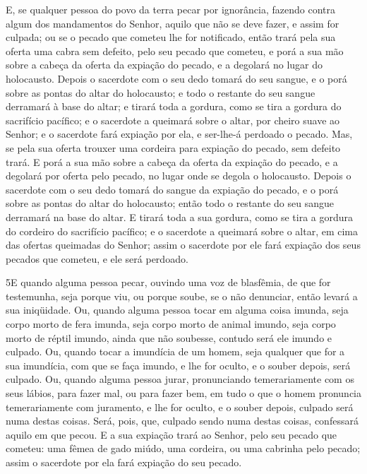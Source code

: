 E, se qualquer pessoa do povo da terra pecar por ignorância,
fazendo contra algum dos mandamentos do Senhor, aquilo que não se
deve fazer, e assim for culpada; ou se o pecado que cometeu
lhe for notificado, então trará pela sua oferta uma cabra sem
defeito, pelo seu pecado que cometeu, e porá a sua mão sobre
a cabeça da oferta da expiação do pecado, e a degolará no lugar do
holocausto. Depois o sacerdote com o seu dedo tomará do seu
sangue, e o porá sobre as pontas do altar do holocausto; e todo o
restante do seu sangue derramará à base do altar; e tirará
toda a gordura, como se tira a gordura do sacrifício pacífico; e o
sacerdote a queimará sobre o altar, por cheiro suave ao Senhor; e o
sacerdote fará expiação por ela, e ser-lhe-á perdoado o pecado.
Mas, se pela sua oferta trouxer uma cordeira para expiação do
pecado, sem defeito trará. E porá a sua mão sobre a cabeça da
oferta da expiação do pecado, e a degolará por oferta pelo pecado,
no lugar onde se degola o holocausto. Depois o sacerdote com
o seu dedo tomará do sangue da expiação do pecado, e o porá sobre as
pontas do altar do holocausto; então todo o restante do seu sangue
derramará na base do altar. E tirará toda a sua gordura, como
se tira a gordura do cordeiro do sacrifício pacífico; e o sacerdote
a queimará sobre o altar, em cima das ofertas queimadas do Senhor;
assim o sacerdote por ele fará expiação dos seus pecados que
cometeu, e ele será perdoado.

\medskip

\lettrine{5} E quando alguma pessoa pecar, ouvindo uma voz de
blasfêmia, de que for testemunha, seja porque viu, ou porque soube,
se o não denunciar, então levará a sua iniqüidade. Ou, quando
alguma pessoa tocar em alguma coisa imunda, seja corpo morto de fera
imunda, seja corpo morto de animal imundo, seja corpo morto de
réptil imundo, ainda que não soubesse, contudo será ele imundo e
culpado. Ou, quando tocar a imundícia de um homem, seja qualquer
que for a sua imundícia, com que se faça imundo, e lhe for oculto, e
o souber depois, será culpado. Ou, quando alguma pessoa jurar,
pronunciando temerariamente com os seus lábios, para fazer mal, ou
para fazer bem, em tudo o que o homem pronuncia temerariamente com
juramento, e lhe for oculto, e o souber depois, culpado será numa
destas coisas. Será, pois, que, culpado sendo numa destas
coisas, confessará aquilo em que pecou. E a sua expiação trará
ao Senhor, pelo seu pecado que cometeu: uma fêmea de gado miúdo, uma
cordeira, ou uma cabrinha pelo pecado; assim o sacerdote por ela
fará expiação do seu pecado.

